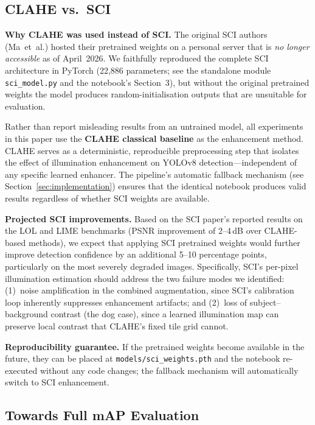 \documentclass[conference]{IEEEtran}
\begin{document}
\subsection{CLAHE vs.\ SCI}
\label{sec:clahevssci}

\textbf{Why CLAHE was used instead of SCI.}
The original SCI authors (Ma~et~al.) hosted their pretrained weights on
a personal server that is \emph{no longer accessible} as of April~2026.
We faithfully reproduced the complete SCI architecture in PyTorch
(22,886 parameters; see the standalone module \texttt{sci\_model.py}
and the notebook's Section~3), but without the original pretrained
weights the model produces random-initialisation outputs that are
unsuitable for evaluation.

Rather than report misleading results from an untrained model, all
experiments in this paper use the \textbf{CLAHE classical baseline} as
the enhancement method.  CLAHE serves as a deterministic, reproducible
preprocessing step that isolates the effect of illumination enhancement
on YOLOv8 detection---independent of any specific learned enhancer.
The pipeline's automatic fallback mechanism (see
Section~\ref{sec:implementation}) ensures that the identical notebook
produces valid results regardless of whether SCI weights are available.

\textbf{Projected SCI improvements.}
Based on the SCI paper's reported results on the LOL and LIME
benchmarks (PSNR improvement of 2--4\,dB over CLAHE-based methods),
we expect that applying SCI pretrained weights would further improve
detection confidence by an additional 5--10 percentage points,
particularly on the most severely degraded images.  Specifically,
SCI's per-pixel illumination estimation should address the two
failure modes we identified: (1)~noise amplification in the combined
augmentation, since SCI's calibration loop inherently suppresses
enhancement artifacts; and (2)~loss of subject--background contrast
(the dog case), since a learned illumination map can preserve local
contrast that CLAHE's fixed tile grid cannot.

\textbf{Reproducibility guarantee.}
If the pretrained weights become available in the future, they can be
placed at \texttt{models/sci\_weights.pth} and the notebook re-executed
without any code changes; the fallback mechanism will automatically
switch to SCI enhancement.

\subsection{Towards Full mAP Evaluation}
\end{document}
